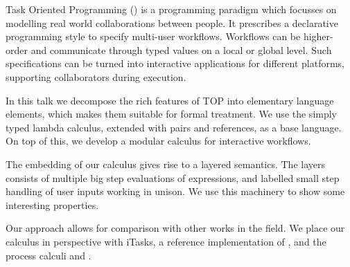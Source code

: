 
Task Oriented Programming (\TOP) is a programming paradigm which focusses on modelling real world collaborations between people.
It prescribes a declarative programming style to specify multi-user workflows.
Workflows can be higher-order and communicate through typed values on a local or global level.
Such specifications can be turned into interactive applications for different platforms,
supporting collaborators during execution.

In this talk we decompose the rich features of TOP into elementary language elements,
which makes them suitable for formal treatment.
We use the simply typed lambda calculus, extended with pairs and references, as a base language.
On top of this, we develop a modular calculus for interactive workflows.

The embedding of our calculus gives rise to a layered semantics.
The layers consists of multiple big step evaluations of expressions,
and labelled small step handling of user inputs working in unison.
We use this machinery to show some interesting properties.

Our approach allows for comparison with other works in the field.
We place our calculus in perspective with iTasks, a reference implementation of \TOP,
and the process calculi \CSP and \CCS.

